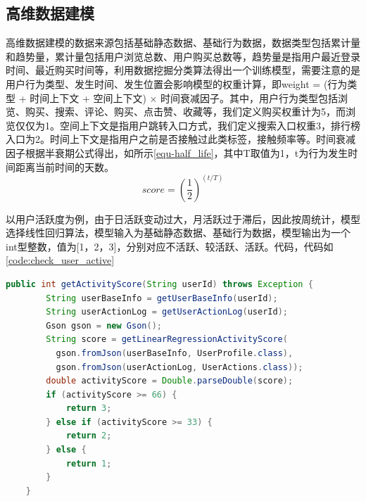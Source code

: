   \subsection{高维数据建模}
  高维数据建模的数据来源包括基础静态数据、基础行为数据，数据类型包括累计量和趋势量，累计量包括用户浏览总数、用户购买总数等，趋势量是指用户最近登录时间、最近购买时间等，利用数据挖掘分类算法得出一个训练模型，需要注意的是用户行为类型、发生时间、发生位置会影响模型的权重计算，即weight = (行为类型 + 时间上下文 + 空间上下文) × 时间衰减因子。其中，用户行为类型包括浏览、购买、搜索、评论、购买、点击赞、收藏等，我们定义购买权重计为5，而浏览仅仅为1。空间上下文是指用户跳转入口方式，我们定义搜索入口权重3，排行榜入口为2。时间上下文是指用户之前是否接触过此类标签，接触频率等。时间衰减因子根据半衰期公式得出，如所示\autoref{equ-half_life}，其中T取值为1，t为行为发生时间距离当前时间的天数。
  \begin{equation}
    score=(\frac{1}{2})^{(t/T)}
    \label{equ-half_life}
  \end{equation}

  以用户活跃度为例，由于日活跃变动过大，月活跃过于滞后，因此按周统计，模型选择线性回归算法，模型输入为基础静态数据、基础行为数据，模型输出为一个int型整数，值为[1，2，3]，分别对应不活跃、较活跃、活跃。代码，代码如\autoref{code:check_user_active}
  \begin{lstlisting}[language=java,firstnumber=1,label={code:check_user_active}]
    public int getActivityScore(String userId) throws Exception {
        String userBaseInfo = getUserBaseInfo(userId);
        String userActionLog = getUserActionLog(userId);
        Gson gson = new Gson();
        String score = getLinearRegressionActivityScore(
          gson.fromJson(userBaseInfo, UserProfile.class), 
          gson.fromJson(userActionLog, UserActions.class));
        double activityScore = Double.parseDouble(score);
        if (activityScore >= 66) {
            return 3;
        } else if (activityScore >= 33) {
            return 2;
        } else {
            return 1;
        }
    }
  \end{lstlisting}

